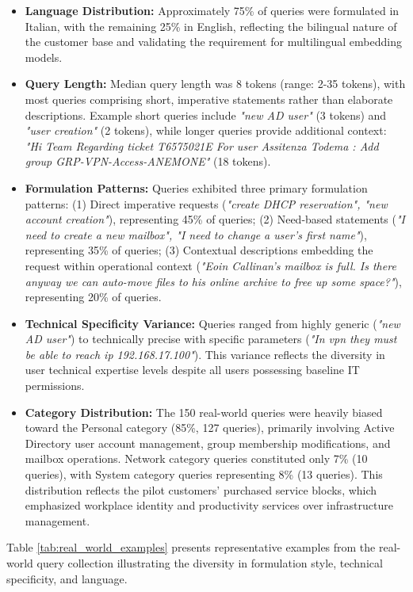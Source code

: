 \begin{itemize}
    \item \textbf{Language Distribution:} Approximately 75\% of queries were formulated in Italian, with the remaining 25\% in English, reflecting the bilingual nature of the customer base and validating the requirement for multilingual embedding models.
    \item \textbf{Query Length:} Median query length was 8 tokens (range: 2-35 tokens), with most queries comprising short, imperative statements rather than elaborate descriptions. Example short queries include \textit{"new AD user"} (3 tokens) and \textit{"user creation"} (2 tokens), while longer queries provide additional context: \textit{"Hi Team Regarding ticket T6575021E For user Assitenza Todema : Add group GRP-VPN-Access-ANEMONE"} (18 tokens).
    \item \textbf{Formulation Patterns:} Queries exhibited three primary formulation patterns: (1) Direct imperative requests (\textit{"create DHCP reservation", "new account creation"}), representing 45\% of queries; (2) Need-based statements (\textit{"I need to create a new mailbox", "I need to change a user's first name"}), representing 35\% of queries; (3) Contextual descriptions embedding the request within operational context (\textit{"Eoin Callinan's mailbox is full. Is there anyway we can auto-move files to his online archive to free up some space?"}), representing 20\% of queries.
    \item \textbf{Technical Specificity Variance:} Queries ranged from highly generic (\textit{"new AD user"}) to technically precise with specific parameters (\textit{"In vpn they must be able to reach ip 192.168.17.100"}). This variance reflects the diversity in user technical expertise levels despite all users possessing baseline IT permissions.
    \item \textbf{Category Distribution:} The 150 real-world queries were heavily biased toward the Personal category (85\%, 127 queries), primarily involving Active Directory user account management, group membership modifications, and mailbox operations. Network category queries constituted only 7\% (10 queries), with System category queries representing 8\% (13 queries). This distribution reflects the pilot customers' purchased service blocks, which emphasized workplace identity and productivity services over infrastructure management.
\end{itemize}

Table \ref{tab:real_world_examples} presents representative examples from the real-world query collection illustrating the diversity in formulation style, technical specificity, and language.

